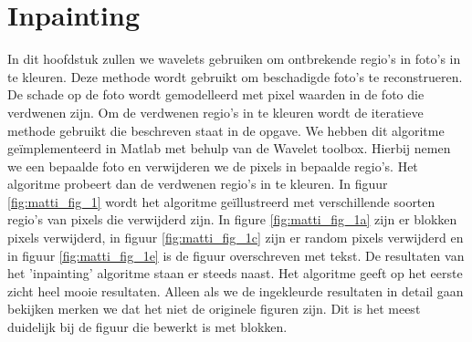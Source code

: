 \section{Inpainting}

In dit hoofdstuk zullen we wavelets gebruiken om ontbrekende regio's in foto's in te kleuren. Deze methode wordt gebruikt om beschadigde foto's te reconstrueren. De schade op de foto wordt gemodelleerd met pixel waarden in de foto die verdwenen zijn. Om de verdwenen regio's in te kleuren wordt de iteratieve methode gebruikt die beschreven staat in de opgave. We hebben dit algoritme ge\"{i}mplementeerd in Matlab met behulp van de Wavelet toolbox. Hierbij nemen we een bepaalde foto en verwijderen we de pixels in bepaalde regio's. Het algoritme probeert dan de verdwenen regio's in te kleuren. 
\newline
\newline
In figuur \ref{fig:matti_fig_1} wordt het algoritme ge\"{i}llustreerd met verschillende soorten regio's van pixels die verwijderd zijn. In figure \ref{fig:matti_fig_1a} zijn er blokken pixels verwijderd, in figuur \ref{fig:matti_fig_1c} zijn er random pixels verwijderd en in figuur \ref{fig:matti_fig_1e} is de figuur overschreven met tekst. De resultaten van het 'inpainting' algoritme staan er steeds naast. Het algoritme geeft op het eerste zicht heel mooie resultaten. Alleen als we de ingekleurde resultaten in detail gaan bekijken merken we dat het niet de originele figuren zijn. Dit is het meest duidelijk bij de figuur die bewerkt is met blokken.


